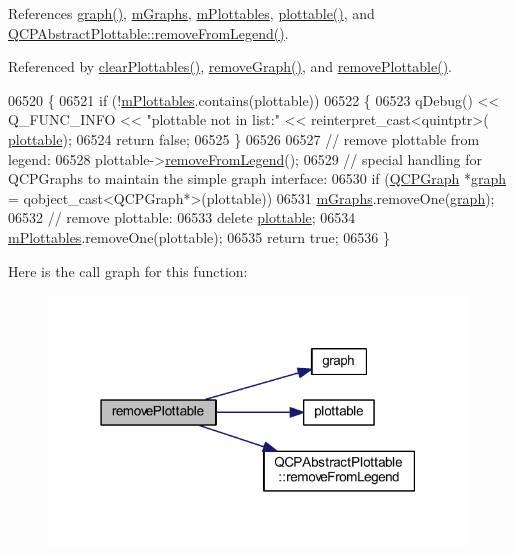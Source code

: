 References \hyperlink{a00116_ac6b19830ab0f0073ff3089cf7c9b3c2e}{graph()}, \hyperlink{a00116_source_l02116}{m\+Graphs}, \hyperlink{a00116_source_l02115}{m\+Plottables}, \hyperlink{a00116_a5c198d46ea2a2255a1b73e2c590f0364}{plottable()}, and \hyperlink{a00115_source_l08638}{Q\+C\+P\+Abstract\+Plottable\+::remove\+From\+Legend()}.



Referenced by \hyperlink{a00115_source_l06560}{clear\+Plottables()}, \hyperlink{a00115_source_l06719}{remove\+Graph()}, and \hyperlink{a00115_source_l06542}{remove\+Plottable()}.


\begin{DoxyCode}
06520 \{
06521   \textcolor{keywordflow}{if} (!\hyperlink{a00116_a57ed6eb2e0a767a8344de45110a3e81d}{mPlottables}.contains(plottable))
06522   \{
06523     qDebug() << Q\_FUNC\_INFO << \textcolor{stringliteral}{"plottable not in list:"} << \textcolor{keyword}{reinterpret\_cast<}quintptr\textcolor{keyword}{>}(
      \hyperlink{a00116_a5c198d46ea2a2255a1b73e2c590f0364}{plottable});
06524     \textcolor{keywordflow}{return} \textcolor{keyword}{false};
06525   \}
06526   
06527   \textcolor{comment}{// remove plottable from legend:}
06528   plottable->\hyperlink{a00024_aa1f350e510326d012b9a9c9249736c83}{removeFromLegend}();
06529   \textcolor{comment}{// special handling for QCPGraphs to maintain the simple graph interface:}
06530   \textcolor{keywordflow}{if} (\hyperlink{a00031}{QCPGraph} *\hyperlink{a00116_ac6b19830ab0f0073ff3089cf7c9b3c2e}{graph} = qobject\_cast<QCPGraph*>(plottable))
06531     \hyperlink{a00116_a54ed2081d9366a6c2137bf9d9f7b8371}{mGraphs}.removeOne(\hyperlink{a00116_ac6b19830ab0f0073ff3089cf7c9b3c2e}{graph});
06532   \textcolor{comment}{// remove plottable:}
06533   \textcolor{keyword}{delete} \hyperlink{a00116_a5c198d46ea2a2255a1b73e2c590f0364}{plottable};
06534   \hyperlink{a00116_a57ed6eb2e0a767a8344de45110a3e81d}{mPlottables}.removeOne(plottable);
06535   \textcolor{keywordflow}{return} \textcolor{keyword}{true};
06536 \}
\end{DoxyCode}


Here is the call graph for this function\+:
\nopagebreak
\begin{figure}[H]
\begin{center}
\leavevmode
\includegraphics[width=315pt]{d4/d3e/a00116_af3dafd56884208474f311d6226513ab2_cgraph}
\end{center}
\end{figure}




